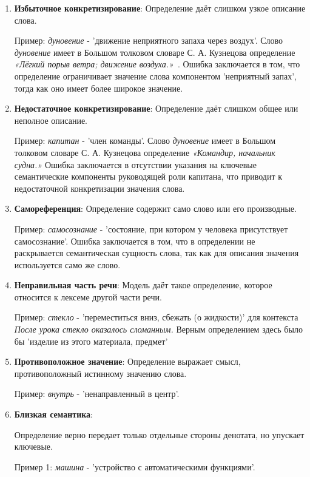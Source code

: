 \documentclass[LI,VKR]{HSEUniversity}
\begin{document}
\begin{enumerate}
    \item \textbf{Избыточное конкретизирование}:
Определение даёт слишком узкое описание слова.

Пример: \emph{дуновение} - ’движение неприятного запаха через воздух’.
Слово \textit{дуновение} имеет в Большом толковом словаре С. А. Кузнецова определение
\textit{«Лёгкий порыв ветра; движение воздуха.»}~\cite{TolkovyKuznetsov}.
Ошибка заключается в том, что определение ограничивает значение слова компонентом
’неприятный запах’, тогда как оно имеет более широкое значение.

    \item \textbf{Недостаточное конкретизирование}:
Определение даёт слишком общее или неполное описание.

Пример: \emph{капитан} - ’член команды’.
Слово \textit{дуновение} имеет в Большом толковом словаре С. А. Кузнецова определение
\textit{«Командир, начальник судна.»}
Ошибка заключается в отсутствии указания на ключевые семантические компоненты
руководящей роли капитана, что приводит к недостаточной конкретизации значения слова.

    \item \textbf{Самореференция}:
Определение содержит само слово или его производные.

Пример: \emph{самосознание} - ’состояние, при котором у человека присутствует самосознание’.
Ошибка заключается в том, что в определении не раскрывается семантическая сущность слова,
так как для описания значения используется само же слово.

    \item \textbf{Неправильная часть речи}:
Модель даёт такое определение, которое относится к лексеме другой части речи.

Пример: \emph{стекло} - ’переместиться вниз, сбежать (о жидкости)’ для контекста
\textit{После урока стекло оказалось сломанным.}
Верным определением здесь было бы ’изделие из этого материала, предмет’

    \item \textbf{Противоположное значение}:
Определение выражает смысл, противоположный истинному значению слова.

Пример: \emph{внутрь} - ’ненаправленный в центр’.
    \item \textbf{Близкая семантика}:

Определение верно передает только отдельные стороны денотата, но упускает ключевые.

Пример 1: \emph{машина} - ’устройство с автоматическими функциями’.


\end{enumerate}
\end{document}
